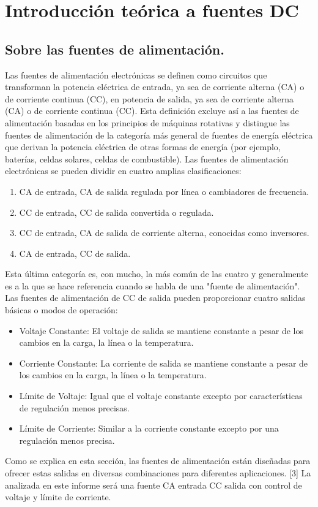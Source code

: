 \chapter{Introducción teórica a fuentes DC}

\label{C:Fuentes de corriente continua}

\section{Sobre las fuentes de alimentación.}
Las fuentes de alimentación electrónicas se definen como circuitos que transforman la potencia eléctrica de entrada, ya sea de corriente alterna (CA) o de corriente continua (CC), en potencia de salida, ya sea de corriente alterna (CA) o de corriente continua (CC). Esta definición excluye así a las fuentes de alimentación basadas en los principios de máquinas rotativas y distingue las fuentes de alimentación de la categoría más general de fuentes de energía eléctrica que derivan la potencia eléctrica de otras formas de energía (por ejemplo, baterías, celdas solares, celdas de combustible). Las fuentes de alimentación electrónicas se pueden dividir en cuatro amplias clasificaciones:

\begin{enumerate}
    \item CA de entrada, CA de salida regulada por línea o cambiadores de frecuencia.
    \item CC de entrada, CC de salida convertida o regulada.
    \item CC de entrada, CA de salida de corriente alterna, conocidas como inversores.
    \item CA de entrada, CC de salida.
\end{enumerate}

Esta última categoría es, con mucho, la más común de las cuatro y generalmente es a la que se hace referencia cuando se habla de una "fuente de alimentación". Las fuentes de alimentación de CC de salida pueden proporcionar cuatro salidas básicas o modos de operación:

\begin{itemize}
    \item Voltaje Constante: El voltaje de salida se mantiene constante a pesar de los cambios en la carga, la línea o la temperatura.
    \item Corriente Constante: La corriente de salida se mantiene constante a pesar de los cambios en la carga, la línea o la temperatura.
    \item Límite de Voltaje: Igual que el voltaje constante excepto por características de regulación menos precisas.
    \item Límite de Corriente: Similar a la corriente constante excepto por una regulación menos precisa.
\end{itemize}
Como se explica en esta sección, las fuentes de alimentación están diseñadas para ofrecer estas salidas en diversas combinaciones para diferentes aplicaciones. [3]
La analizada en este informe será una fuente CA entrada CC salida con control de voltaje y límite de corriente.

